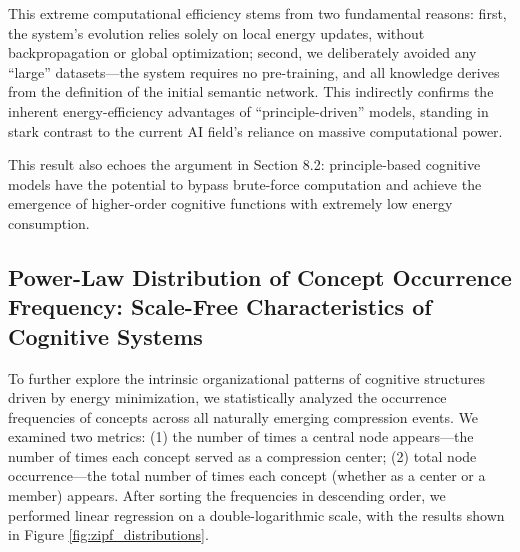 \documentclass[10pt,onecolumn]{article}
\begin{document}
This extreme computational efficiency stems from two fundamental reasons: first, the system’s evolution relies solely on local energy updates, without backpropagation or global optimization; second, we deliberately avoided any “large” datasets—the system requires no pre-training, and all knowledge derives from the definition of the initial semantic network. This indirectly confirms the inherent energy-efficiency advantages of “principle-driven” models, standing in stark contrast to the current AI field’s reliance on massive computational power.

This result also echoes the argument in Section 8.2: principle-based cognitive models have the potential to bypass brute-force computation and achieve the emergence of higher-order cognitive functions with extremely low energy consumption.

\subsection{Power-Law Distribution of Concept Occurrence Frequency: Scale-Free Characteristics of Cognitive Systems}

To further explore the intrinsic organizational patterns of cognitive structures driven by energy minimization, we statistically analyzed the occurrence frequencies of concepts across all naturally emerging compression events. We examined two metrics: (1) the number of times a central node appears—the number of times each concept served as a compression center; (2) total node occurrence—the total number of times each concept (whether as a center or a member) appears. After sorting the frequencies in descending order, we performed linear regression on a double-logarithmic scale, with the results shown in Figure \ref{fig:zipf_distributions}.
\end{document}
